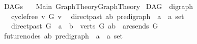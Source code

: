 %
\begin{isabellebody}%
%
%
\isadelimtheory
\isanewline
\isanewline
\isanewline
%
\endisadelimtheory
%
\isatagtheory
{}\isamarkupfalse%
\ DAGs\isanewline
\ \ \ Main\ {\isachardoublequoteopen}Graph{\isacharunderscore}{\kern0pt}Theory{\isachardot}{\kern0pt}Graph{\isacharunderscore}{\kern0pt}Theory{\isachardoublequoteclose}\isanewline
{}%
\endisatagtheory
{\isafoldtheory}%
%
\isadelimtheory
%
\endisadelimtheory
%
\isadelimdocument
%
\endisadelimdocument
%
\isatagdocument
%
\isamarkuptrue%
%
\endisatagdocument
{\isafolddocument}%
%
\isadelimdocument
%
\endisadelimdocument
{}\isamarkupfalse%
\ DAG\ {\isacharequal}{\kern0pt}\ digraph\ {\isacharplus}{\kern0pt}\isanewline
\ \ \ cycle{\isacharunderscore}{\kern0pt}free{\isacharcolon}{\kern0pt}\ {\isachardoublequoteopen}{\isasymnot}{\isacharparenleft}{\kern0pt}v\ {\isasymrightarrow}\isactrlsup {\isacharplus}{\kern0pt}\isactrlbsub G\isactrlesub \ v{\isacharparenright}{\kern0pt}{\isachardoublequoteclose}%
\isadelimdocument
%
\endisadelimdocument
%
\isatagdocument
%
\isamarkuptrue%
%
\endisatagdocument
{\isafolddocument}%
%
\isadelimdocument
%
\endisadelimdocument
{}\isamarkupfalse%
\ \ direct{\isacharunderscore}{\kern0pt}past{\isacharcolon}{\kern0pt}{\isacharcolon}{\kern0pt}\ {\isachardoublequoteopen}{\isacharparenleft}{\kern0pt}{\isacharprime}{\kern0pt}a{\isacharcomma}{\kern0pt}{\isacharprime}{\kern0pt}b{\isacharparenright}{\kern0pt}\ pre{\isacharunderscore}{\kern0pt}digraph\ {\isasymRightarrow}\ {\isacharprime}{\kern0pt}a\ {\isasymRightarrow}\ {\isacharprime}{\kern0pt}a\ set{\isachardoublequoteclose}\isanewline
\ \ \ {\isachardoublequoteopen}direct{\isacharunderscore}{\kern0pt}past\ G\ \ a\ {\isacharequal}{\kern0pt}\ {\isacharbraceleft}{\kern0pt}b\ {\isasymin}\ verts\ G{\isachardot}{\kern0pt}\ {\isacharparenleft}{\kern0pt}a{\isacharcomma}{\kern0pt}b{\isacharparenright}{\kern0pt}\ {\isasymin}\ arcs{\isacharunderscore}{\kern0pt}ends\ G{\isacharbraceright}{\kern0pt}{\isachardoublequoteclose}\isanewline
\isanewline
{}\isamarkupfalse%
\ future{\isacharunderscore}{\kern0pt}nodes{\isacharcolon}{\kern0pt}{\isacharcolon}{\kern0pt}\ {\isachardoublequoteopen}{\isacharparenleft}{\kern0pt}{\isacharprime}{\kern0pt}a{\isacharcomma}{\kern0pt}{\isacharprime}{\kern0pt}b{\isacharparenright}{\kern0pt}\ pre{\isacharunderscore}{\kern0pt}digraph\ {\isasymRightarrow}\ {\isacharprime}{\kern0pt}a\ {\isasymRightarrow}\ {\isacharprime}{\kern0pt}a\ set{\isachardoublequoteclose}\isanewline

\end{isabellebody}
